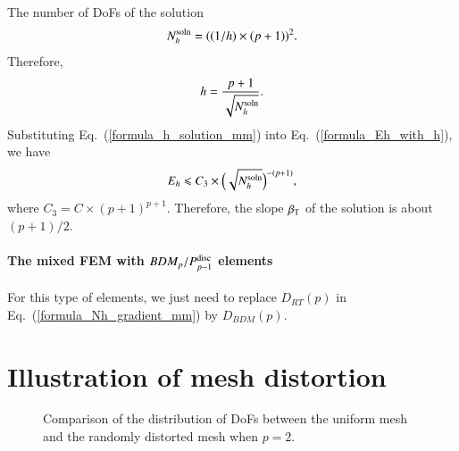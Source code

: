 \documentclass[review,3p]{elsarticle}
\begin{document}
The number of DoFs of the solution
\begin{equation}
N_h^{\rm soln} = ((1/h) \times (p+1))^2.			\label{formula_Nh_solution_mm}
\end{equation}
Therefore, 
\begin{equation}
h = \frac{p+1}{\sqrt{N_h^{\rm soln}}}.		\label{formula_h_solution_mm}
\end{equation}
Substituting Eq.~(\ref{formula_h_solution_mm}) into Eq.~(\ref{formula_Eh_with_h}), we have
\begin{equation}
E_h \leqslant C_3 \times \Big(\sqrt{N_h^{\rm soln}}\Big)^{-(p+1)},			\label{formula_Eh_with_Nh_solution_mm}
\end{equation}
where $C_3=C \times (p+1)^{p+1}$. Therefore, the slope $\beta_{\rm T}$ of the solution is about $(p+1)/2$.

\paragraph{The mixed FEM with \texorpdfstring{$BDM_p/P_{p-1}^{\rm disc}$}{BDM_p/Q_p-1{disc}} elements}

For this type of elements, we just need to replace $D_{RT}(p)$ in Eq.~(\ref{formula_Nh_gradient_mm}) by $D_{BDM}(p)$.

\section{Illustration of mesh distortion}

\begin{figure}[!ht]
\centering
   \caption{Comparison of the distribution of DoFs between the uniform mesh and the randomly distorted mesh when $p=2$.}
   \label{measuring_distortion_randomly}
\end{figure}
\end{document}
